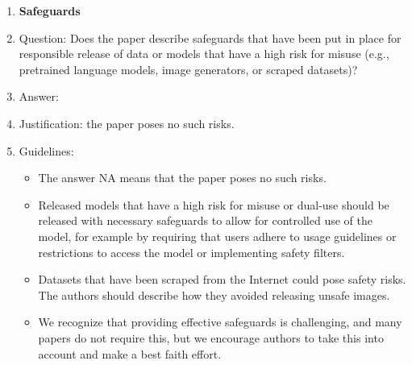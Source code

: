 \documentclass{article}
\theoremstyle{plain}
\theoremstyle{definition}
\theoremstyle{remark}
\begin{document}
\begin{enumerate}
\item {\bf Safeguards}
    \item[] Question: Does the paper describe safeguards that have been put in place for responsible release of data or models that have a high risk for misuse (e.g., pretrained language models, image generators, or scraped datasets)?
    \item[] Answer: \answerNA{} %
    \item[] Justification: the paper poses no such risks.
    \item[] Guidelines:
    \begin{itemize}
        \item The answer NA means that the paper poses no such risks.
        \item Released models that have a high risk for misuse or dual-use should be released with necessary safeguards to allow for controlled use of the model, for example by requiring that users adhere to usage guidelines or restrictions to access the model or implementing safety filters. 
        \item Datasets that have been scraped from the Internet could pose safety risks. The authors should describe how they avoided releasing unsafe images.
        \item We recognize that providing effective safeguards is challenging, and many papers do not require this, but we encourage authors to take this into account and make a best faith effort.
    \end{itemize}


\end{enumerate}
\end{document}

